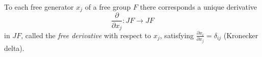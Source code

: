 To each free generator $x_j$ of a free group $F$ there corresponds a unique derivative
$$\frac{\partial}{\partial x_j}: JF \to JF$$
in $JF$, called the \textit{free derivative} with respect to $x_j$, satisfying $\frac{\partial x_i}{\partial x_j} = \delta_{ij}$ (Kronecker delta).
